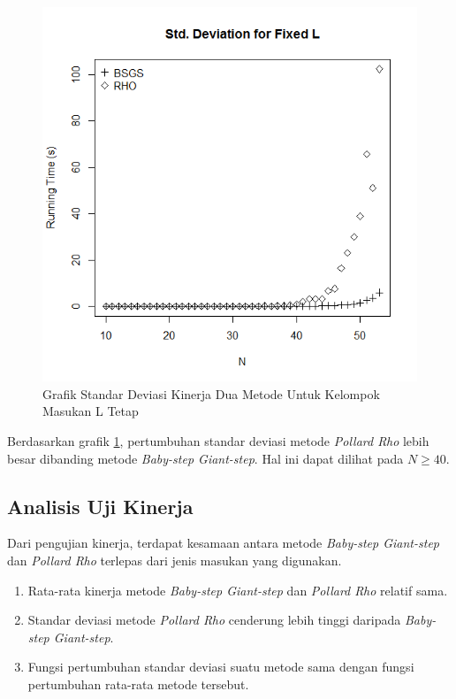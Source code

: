 \begin{figure}[h!]
	\Centering
	\includegraphics[angle=0, scale=0.55]{bab5/img/sdev-fixed-l}
	\caption{Grafik Standar Deviasi Kinerja Dua Metode Untuk Kelompok Masukan L Tetap}
	\label{fig:stddev_fixed_l}
\end{figure}

Berdasarkan grafik \ref{fig:stddev_fixed_l}, pertumbuhan standar deviasi metode \textit{Pollard Rho} lebih besar dibanding metode \textit{Baby-step Giant-step}. Hal ini dapat dilihat pada $ N \geq 40 $.

\subsection{Analisis Uji Kinerja}

Dari pengujian kinerja, terdapat kesamaan antara metode \textit{Baby-step Giant-step} dan \textit{Pollard Rho} terlepas dari jenis masukan yang digunakan.

\begin{enumerate}
	\item Rata-rata kinerja metode \textit{Baby-step Giant-step} dan \textit{Pollard Rho} relatif sama.
	\item Standar deviasi metode \textit{Pollard Rho} cenderung lebih tinggi daripada \textit{Baby-step Giant-step}.
	\item Fungsi pertumbuhan standar deviasi suatu metode sama dengan fungsi pertumbuhan rata-rata metode tersebut.
\end{enumerate}

